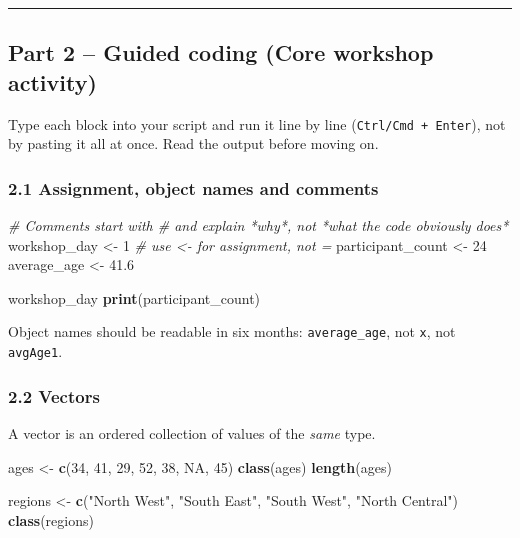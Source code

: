 \documentclass[11pt]{article}
\newenvironment{Shaded}{\begin{snugshade}}{\end{snugshade}}
\newcommand{\CommentTok}[1]{\textcolor[rgb]{0.56,0.35,0.01}{\textit{#1}}}
\newcommand{\ConstantTok}[1]{\textcolor[rgb]{0.56,0.35,0.01}{#1}}
\newcommand{\DecValTok}[1]{\textcolor[rgb]{0.00,0.00,0.81}{#1}}
\newcommand{\FloatTok}[1]{\textcolor[rgb]{0.00,0.00,0.81}{#1}}
\newcommand{\FunctionTok}[1]{\textcolor[rgb]{0.13,0.29,0.53}{\textbf{#1}}}
\newcommand{\NormalTok}[1]{#1}
\newcommand{\OtherTok}[1]{\textcolor[rgb]{0.56,0.35,0.01}{#1}}
\newcommand{\StringTok}[1]{\textcolor[rgb]{0.31,0.60,0.02}{#1}}
\begin{document}
\begin{center}\rule{0.5\linewidth}{0.5pt}\end{center}

\hypertarget{part-2-guided-coding-core-workshop-activity}{%
\subsection{Part 2 -- Guided coding (Core workshop
activity)}\label{part-2-guided-coding-core-workshop-activity}}

Type each block into your script and run it line by line
(\texttt{Ctrl/Cmd\ +\ Enter}), not by pasting it all at once. Read the
output before moving on.

\hypertarget{assignment-object-names-and-comments}{%
\subsubsection{2.1 Assignment, object names and
comments}\label{assignment-object-names-and-comments}}

\begin{Shaded}
\begin{Highlighting}[]
\CommentTok{\# Comments start with \# and explain *why*, not *what the code obviously does*}
\NormalTok{workshop\_day }\OtherTok{\textless{}{-}} \DecValTok{1}          \CommentTok{\# use \textless{}{-} for assignment, not =}
\NormalTok{participant\_count }\OtherTok{\textless{}{-}} \DecValTok{24}
\NormalTok{average\_age }\OtherTok{\textless{}{-}} \FloatTok{41.6}

\NormalTok{workshop\_day}
\FunctionTok{print}\NormalTok{(participant\_count)}
\end{Highlighting}
\end{Shaded}

Object names should be readable in six months: \texttt{average\_age},
not \texttt{x}, not \texttt{avgAge1}.

\hypertarget{vectors}{%
\subsubsection{2.2 Vectors}\label{vectors}}

A vector is an ordered collection of values of the \emph{same} type.

\begin{Shaded}
\begin{Highlighting}[]
\NormalTok{ages }\OtherTok{\textless{}{-}} \FunctionTok{c}\NormalTok{(}\DecValTok{34}\NormalTok{, }\DecValTok{41}\NormalTok{, }\DecValTok{29}\NormalTok{, }\DecValTok{52}\NormalTok{, }\DecValTok{38}\NormalTok{, }\ConstantTok{NA}\NormalTok{, }\DecValTok{45}\NormalTok{)}
\FunctionTok{class}\NormalTok{(ages)}
\FunctionTok{length}\NormalTok{(ages)}

\NormalTok{regions }\OtherTok{\textless{}{-}} \FunctionTok{c}\NormalTok{(}\StringTok{"North West"}\NormalTok{, }\StringTok{"South East"}\NormalTok{, }\StringTok{"South West"}\NormalTok{, }\StringTok{"North Central"}\NormalTok{)}
\FunctionTok{class}\NormalTok{(regions)}
\end{Highlighting}
\end{Shaded}
\end{document}
